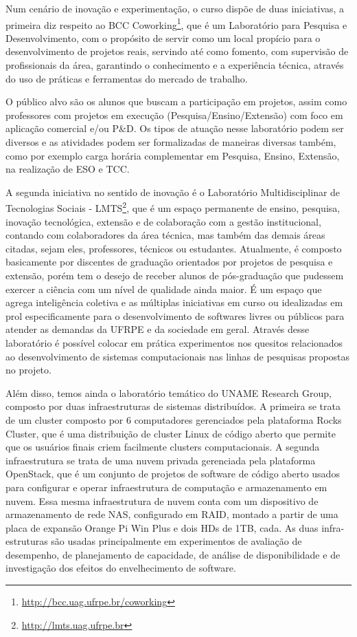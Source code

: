 \documentclass[
	12pt,				%
	openright,			%
  oneside,     %
	a4paper,			%
 hyphens,
	chapter=TITLE,		%
	english,			%
	french,				%
	spanish,			%
	brazil				%
	]{abntex2}
\begin{document}
Num cenário de inovação e experimentação, o curso dispõe de duas iniciativas, a primeira diz respeito ao BCC Coworking\footnote{\url{http://bcc.uag.ufrpe.br/coworking}}, que é um Laboratório para Pesquisa e Desenvolvimento, com o propósito de servir como um local propício para o desenvolvimento de projetos reais, servindo até como fomento, com supervisão de profissionais da área, garantindo o conhecimento e a experiência técnica, através do uso de práticas e ferramentas do mercado de trabalho. 

O público alvo são os alunos que buscam a participação em projetos, assim como professores com projetos em execução (Pesquisa/Ensino/Extensão) com foco em aplicação comercial e/ou P\&D. Os tipos de atuação nesse laboratório podem ser diversos e as atividades podem ser formalizadas de maneiras diversas também, como por exemplo carga horária complementar em Pesquisa, Ensino, Extensão, na realização de ESO e TCC.

A segunda iniciativa no sentido de inovação é o Laboratório Multidisciplinar de Tecnologias Sociais - LMTS\footnote{\url{http://lmts.uag.ufrpe.br}}, que é um espaço permanente de ensino, pesquisa, inovação tecnológica, extensão e de colaboração com a gestão institucional, contando com colaboradores da área técnica, mas também das demais áreas citadas, sejam eles, professores, técnicos ou estudantes. Atualmente, é composto basicamente por discentes de graduação orientados por projetos de pesquisa e extensão, porém tem o desejo de receber alunos de pós-graduação que pudessem exercer a ciência com um nível de qualidade ainda maior. É um espaço que agrega inteligência coletiva e as múltiplas iniciativas em curso ou idealizadas em prol especificamente para o desenvolvimento de softwares livres ou públicos para atender as demandas da UFRPE e da sociedade em geral. Através desse laboratório é possível colocar em prática experimentos nos quesitos relacionados ao desenvolvimento de sistemas computacionais nas linhas de pesquisas propostas no projeto.

Além disso, temos ainda o laboratório temático do UNAME Research Group, composto por duas infraestruturas de sistemas distribuídos. A primeira se trata de um cluster composto por 6 computadores gerenciados pela plataforma Rocks Cluster, que é uma distribuição de cluster Linux de código aberto que permite que os usuários finais criem facilmente clusters computacionais. A segunda infraestrutura se trata de uma nuvem privada gerenciada pela plataforma OpenStack, que é um conjunto de projetos de software de código aberto usados para configurar e operar infraestrutura de computação e armazenamento em nuvem. Essa mesma infraestrutura de nuvem conta com um dispositivo de armazenamento de rede NAS, configurado em RAID, montado a partir de uma placa de expansão Orange Pi Win Plus e dois HDs de 1TB, cada. As duas infra-estruturas são usadas principalmente em experimentos de avaliação de desempenho, de planejamento de capacidade, de análise de disponibilidade e de investigação dos efeitos do envelhecimento de software. 
\end{document}
